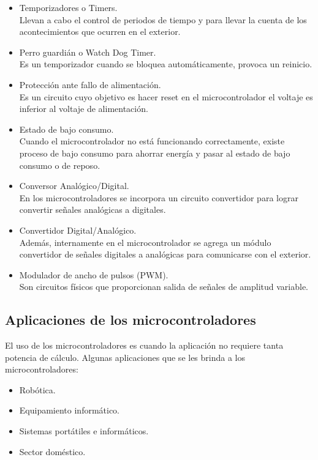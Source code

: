 \begin{itemize}
	\item Temporizadores o Timers. \\
		Llevan a cabo el control de periodos de tiempo y para llevar la 
		cuenta de los acontecimientos que ocurren en el exterior. 
	\item Perro guardián o Watch Dog Timer. \\
		Es un temporizador cuando se bloquea automáticamente, provoca un 
		reinicio. 
	\item Protección ante fallo de alimentación. \\
		Es un circuito cuyo objetivo es hacer reset en el 
		microcontrolador el voltaje es inferior al voltaje de 
		alimentación. 
	\item Estado de bajo consumo. \\
		Cuando el microcontrolador no está funcionando correctamente, 
		existe proceso de bajo consumo para ahorrar energía y pasar al 
		estado de bajo consumo o de reposo. 
	\item Conversor Analógico/Digital. \\
		En los microcontroladores se incorpora un circuito convertidor 
		para lograr convertir señales
		analógicas a digitales.
	\item Convertidor Digital/Analógico. \\
		Además, internamente en el microcontrolador se agrega un módulo 
		convertidor de señales	digitales a analógicas para comunicarse 
		con el exterior. 
	\item Modulador de ancho de pulsos (PWM). \\
		Son circuitos físicos que proporcionan salida de señales de 
		amplitud variable. 
\end{itemize}

%
\subsection{Aplicaciones de los microcontroladores}
El uso de los microcontroladores es cuando la aplicación no requiere tanta 
potencia de cálculo. Algunas aplicaciones que se les brinda a los 
microcontroladores:

\begin{itemize}
	\item Robótica.
	\item Equipamiento informático.
	\item Sistemas portátiles e informáticos.
	\item Sector doméstico.
\end{itemize}

